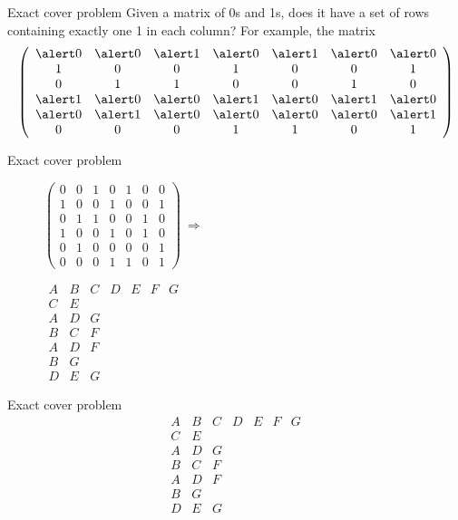 \documentclass[xcolor=svgnames]{beamer}
\begin{document}
\let\a\alert
%
\begin{frame}{Exact cover problem}
  Given a matrix of 0s and 1s, does it have a set of rows
  containing exactly one 1 in each column? For example, the matrix
  $$
  \left(\begin{array}{ccccccc}
    \a0&\a0&\a1&\a0&\a1&\a0&\a0\\
    1&0&0&1&0&0&1\\
    0&1&1&0&0&1&0\\
    \a1&\a0&\a0&\a1&\a0&\a1&\a0\\
    \a0&\a1&\a0&\a0&\a0&\a0&\a1\\
    0&0&0&1&1&0&1
    \end{array}\right)
$$
\end{frame}

%
\begin{frame}{Exact cover problem}
  \centering
  \begin{figure}[!htb]
    \begin{minipage}{.6\textwidth}
      \centering
      $\left(\begin{array}{ccccccc}
    0&0&1&0&1&0&0\\
    1&0&0&1&0&0&1\\
    0&1&1&0&0&1&0\\
    1&0&0&1&0&1&0\\
    0&1&0&0&0&0&1\\
    0&0&0&1&1&0&1
  \end{array}\right)\ \Rightarrow$
    \end{minipage}%
    \begin{minipage}{.4\textwidth}
      \centering
  $
  \begin{array}{ccccccc}
    A & B & C & D & E & F & G\\
    \hline
    C & E &&&&&\\
    A & D & G &&&&\\
    B & C & F &&&&\\
    A & D & F &&&&\\
    B & G &&&&&\\
    D & E & G &&&&
  \end{array}
  $
    \end{minipage}
\end{figure}
\end{frame}

\renewcommand\arraystretch{1.3}
%
\begin{frame}{Exact cover problem} 
  $$
  \begin{array}{ccccccc}
    A & B & C & D & E & F & G\\
    \hline
    C & E &&&&&\\
    A & D & G &&&&\\
    B & C & F &&&&\\
    A & D & F &&&&\\
    B & G &&&&&\\
    D & E & G &&&&
  \end{array}
  $$
\end{frame}
\end{document}

